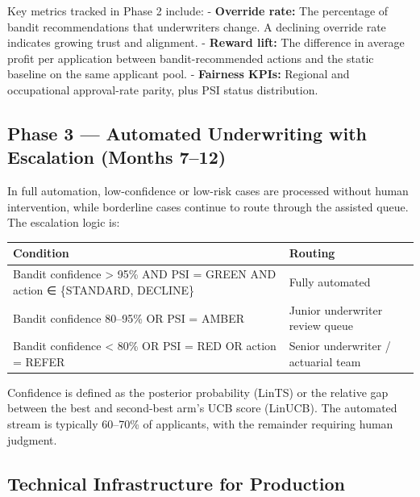 Key metrics tracked in Phase 2 include:
- \textbf{Override rate:} The percentage of bandit recommendations that underwriters change. A declining override rate indicates growing trust and alignment.
- \textbf{Reward lift:} The difference in average profit per application between bandit-recommended actions and the static baseline on the same applicant pool.
- \textbf{Fairness KPIs:} Regional and occupational approval-rate parity, plus PSI status distribution.

\subsection{Phase 3 --- Automated Underwriting with Escalation (Months 7--12)}\label{phase-3-automated-underwriting-with-escalation-months-712}

In full automation, low-confidence or low-risk cases are processed without human intervention, while borderline cases continue to route through the assisted queue. The escalation logic is:

{\def\LTcaptype{none} %
\begin{longtable}[]{@{}
  >{\raggedright\arraybackslash}p{}
  >{\raggedright\arraybackslash}p{}@{}}
\toprule\noalign{}
\begin{minipage}[b]{\linewidth}\raggedright
Condition
\end{minipage} & \begin{minipage}[b]{\linewidth}\raggedright
Routing
\end{minipage} \\
\midrule\noalign{}
\endhead
\bottomrule\noalign{}
\endlastfoot
Bandit confidence \textgreater{} 95\% AND PSI = GREEN AND action ∈ \{STANDARD, DECLINE\} & Fully automated \\
Bandit confidence 80--95\% OR PSI = AMBER & Junior underwriter review queue \\
Bandit confidence \textless{} 80\% OR PSI = RED OR action = REFER & Senior underwriter / actuarial team \\
\end{longtable}
}

Confidence is defined as the posterior probability (LinTS) or the relative gap between the best and second-best arm's UCB score (LinUCB). The automated stream is typically 60--70\% of applicants, with the remainder requiring human judgment.

\subsection{Technical Infrastructure for Production}\label{technical-infrastructure-for-production}

